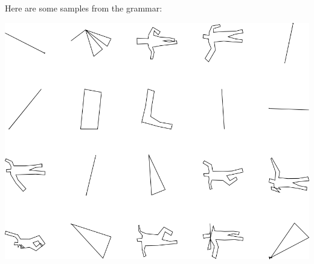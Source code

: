 Here are some samples from the grammar:

\includegraphics[width=6in]{output/3.learning/sdf_tuning/gram.1.d/samples.png}

